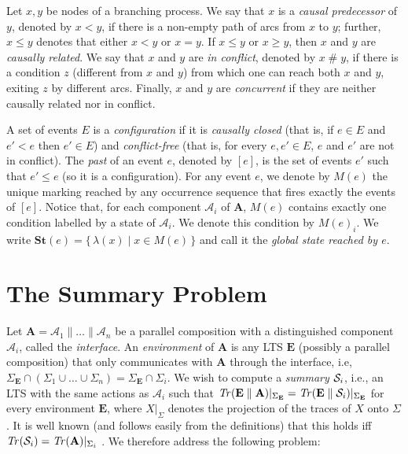 \documentclass{llncs}
\def\A{\mathcal{A}}
\def\prod{\mathbf{A}}
\def\S{\mathcal{S}}
\def\conf{\mathrel{\#}}
\newcommand{\st}[1]{\mathbf{St}(#1)}
\newcommand{\past}[1]{[#1]}
\newcommand{\ma}[1]{M(#1)}
\newcommand{\Tr}[1]{{\it Tr}(#1)}
\renewcommand{\S}{{\cal S}}
\begin{document}
Let $x,y$ be nodes of a branching process. We say that $x$ is 
a \emph{causal predecessor} of $y$, denoted by $x < y$, if there is a non-empty path 
of arcs from $x$ to $y$; further,
$x\leq y$ denotes that either $x<y$ or $x=y$. If $x\leq y$ or $x\geq y$, then $x$ and 
$y$ are \emph{causally related}.
We say that $x$ and $y$ are \emph{in conflict}, denoted by $x \conf y$, if there is a 
condition $z$ (different from $x$ and $y$) from which one can reach both $x$ and $y$, 
exiting $z$ by different arcs.
Finally, $x$ and $y$ are \emph{concurrent} if they are neither causally related nor 
in conflict.

A set of events $E$ is a \emph{configuration} if it is \emph{causally closed} (that is, 
if $e\in E$ and $e'<e$ then $e'\in E$) and \emph{conflict-free} (that is, for every 
$e,e'\in E$, $e$ and $e'$ are not in conflict). 
The \emph{past} of an event $e$, denoted by $\past{e}$, is the set of events $e'$ such 
that $e'\leq e$ (so it is a configuration). For any event $e$,  we denote by $\ma{e}$ the unique marking reached by 
any occurrence sequence that fires exactly the events of $\past{e}$. 
Notice that, for each component $\A_i$ of $\prod$, $\ma{e}$ contains exactly one condition 
labelled by a state of $\A_i$. We denote this condition by $\ma{e}_i$.
We write $\st{e}=\{\,\lambda(x)\mid x\in \ma{e}\,\}$ and call it the 
\emph{global state reached by $e$}.


\section{The Summary Problem}

Let $\prod=\A_1 \parallel \dots \parallel \A_n$ be a parallel composition with a distinguished
component $\A_i$, called the {\em interface}. An {\em environment} of $\prod$ is any LTS
$\mathbf{E}$ (possibly a parallel composition) that only communicates with $\prod$ through the interface,
i.e, $\Sigma_\mathbf{E} \cap (\Sigma_1 \cup \ldots \cup \Sigma_n) = \Sigma_\mathbf{E} \cap \Sigma_i$. We wish to
compute a {\em summary} $\S_i$, i.e., an LTS with the same actions as $\A_i$ such that 
$\Tr{\mathbf{E} \parallel \prod}|_{\Sigma_\mathbf{E}} = \Tr{\mathbf{E} \parallel \S_i}|_{\Sigma_\mathbf{E}}$ for every 
environment $\mathbf{E}$, where $X|_{\Sigma}$ denotes the projection of the traces of $X$ onto 
$\Sigma$. It is well known (and follows easily from the definitions) that this holds if{}f 
$\Tr{\S_i} = \Tr{\prod}|_{\Sigma_i}$ \cite{Hoare85}. We therefore address the following problem:
\end{document}

